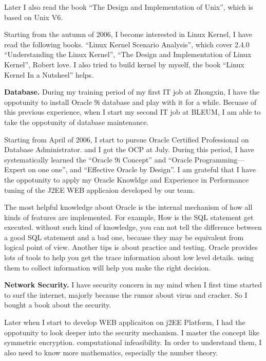 Later I also read the book ``The Design and Implementation of Unix'', which is
 based on Unix V6.

Starting from the autumn of 2006, I become interested in Linux Kernel, I have
read the following books.
 ``Linux Kernel Scenario Analysis'', which cover 2.4.0
 ``Understanding the Linux Kernel'',
 ``The Design and Implementation of Linux Kernel'', Robert love.
I also tried to build kernel by myself, the book ``Linux Kernel In a Nutsheel''
helps.



\medskip\noindent
{\bf Database.}
During my training period of my first IT job at Zhongxin, I have the oppotunity 
to install 
Oracle 9i database and play with it for a while. Becuase of this previous 
experience, when I start my second IT job
at BLEUM, I am able to take the oppotunity of database maintenance.

Starting from April of 2006, I start to pursue Oracle Certified Professional on 
Database Administrator. and I got the OCP at July. During this period, I have 
systematically learned the ``Oracle 9i Concept'' and ``Oracle Programming---%
Expert on one one'', and ``Effective Oracle by Design''. I am grateful that I 
have the oppotunity to apply my Oracle Knowldge and Experience in Performance
tuning of the J2EE WEB applicaion developed by our team.

The most helpful knowledge about Oracle is the internal mechanism of how all 
kinds of features are implemented. For example, How is the SQL statement get
executed. without such kind of knowledge, you can not tell the difference
 between a good SQL statement and a bad one, because they may be equivalent 
 from logical point of view.
 Another tips is about practice and testing. Oracle provides lots of tools to 
 help you get the trace information about low level details. using them to 
 collect information will help you make the right decision.
 
  

\medskip\noindent
{\bf Network Security.}
I have security concern in my mind when I first time started to surf the 
internet, majorly because the rumor about virus and cracker. So I bought a book
about the security.

Later when I start to develop WEB applicaiton on j2EE Platform, I had the 
oppotunity to look deeper into the security mechanism. I master the concept like
symmetric encryption. computational infeasibility. In order to understand them,
I also need to know more mathematics, especially the number theory.

